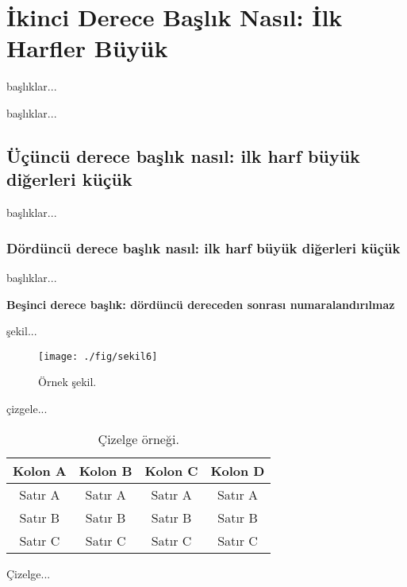\section{İkinci Derece Başlık Nasıl: İlk Harfler Büyük}

başlıklar...

başlıklar... 

\subsection{Üçüncü derece başlık nasıl: ilk harf büyük diğerleri küçük}

başlıklar...

\subsubsection{Dördüncü derece başlık nasıl: ilk harf büyük diğerleri küçük}

başlıklar...

{\bf{Beşinci derece başlık: dördüncü dereceden sonrası numaralandırılmaz}}

şekil...

\begin{figure}[h!]
 \centering
 \texttt{[image: ./fig/sekil6]}
 \vspace*{2mm}
 \caption{Örnek şekil.}
 \label{fig:4-1}
\end{figure}

çizgele...

\begin{table*}[h!]
{\setlength{\tabcolsep}{14pt}
\caption{Çizelge örneği.}
\begin{center}
\vspace{-6mm}
\begin{tabular}{cccc}
\hline\hline
Kolon A & Kolon B & Kolon C & Kolon D \\
\hline
Sat\i r A & Sat\i r A & Sat\i r A & Sat\i r A \\
Sat\i r B & Sat\i r B & Sat\i r B & Sat\i r B \\
Sat\i r C & Sat\i r C & Sat\i r C & Sat\i r C \\
\hline
\end{tabular}
\vspace{-6mm}
\end{center}
\label{tableforCh4-2}}
\end{table*}

Çizelge... 

